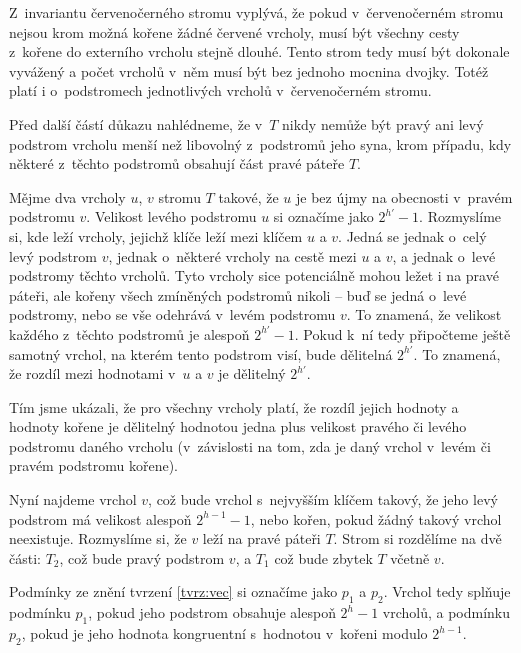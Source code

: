 \begin{dukaz}
Z~invariantu červenočerného stromu vyplývá, že pokud v~červenočerném stromu nejsou krom možná kořene žádné červené vrcholy, musí být všechny cesty z~kořene do externího vrcholu stejně dlouhé. Tento strom tedy musí být dokonale vyvážený a počet vrcholů v~něm musí být bez jednoho mocnina dvojky. Totéž platí i o~podstromech jednotlivých vrcholů v~červenočerném stromu.

Před další částí důkazu nahlédneme, že v~$T$ nikdy nemůže být pravý ani levý podstrom vrcholu menší než libovolný z~podstromů jeho syna, krom případu, kdy některé z~těchto podstromů obsahují část pravé páteře $T$.

Mějme dva vrcholy $u$, $v$ stromu $T$ takové, že $u$ je bez újmy na obecnosti v~pravém
podstromu $v$. Velikost levého podstromu $u$ si označíme jako $2^{h'}-1$. Rozmyslíme si, kde leží vrcholy, jejichž klíče leží mezi klíčem
$u$ a $v$. Jedná se jednak o~celý levý podstrom $v$, jednak o~některé vrcholy
na cestě mezi $u$ a $v$, a jednak o~levé podstromy těchto vrcholů. Tyto vrcholy
sice potenciálně mohou ležet i na pravé páteři, ale kořeny všech zmíněných podstromů nikoli -- buď se jedná o~levé podstromy, nebo se vše odehrává v~levém podstromu $v$. To znamená, že velikost každého z~těchto podstromů je alespoň $2^{h'} - 1$. Pokud k~ní tedy připočteme ještě samotný vrchol, na kterém tento podstrom visí, bude dělitelná $2^{h'}$. To znamená, že rozdíl mezi hodnotami v~$u$ a $v$ je dělitelný $2^{h'}$.

\begin{pozorovani}\label{poz:1}
Tím jsme ukázali, že pro všechny vrcholy platí, že rozdíl jejich hodnoty a hodnoty kořene je dělitelný hodnotou jedna plus velikost pravého či levého podstromu daného vrcholu (v~závislosti na tom, zda je daný vrchol v~levém či pravém podstromu kořene).
\end{pozorovani}

Nyní najdeme vrchol $v$, což bude vrchol s~nejvyšším klíčem takový, že jeho levý
podstrom má velikost alespoň $2^{h-1} -1$, nebo kořen, pokud žádný takový vrchol neexistuje. Rozmyslíme si, že $v$ leží na pravé páteři $T$. Strom si
rozdělíme na dvě části: $T_2$, což bude pravý podstrom $v$, a $T_1$ což bude zbytek $T$ včetně $v$.

Podmínky ze znění tvrzení \ref{tvrz:vec} si označíme jako $p_1$ a $p_2$. Vrchol tedy splňuje podmínku $p_1$, pokud jeho podstrom obsahuje alespoň $2^h-1$ vrcholů, a podmínku $p_2$, pokud je jeho hodnota kongruentní s~hodnotou v~kořeni modulo $2^{h-1}$.


\end{dukaz}
